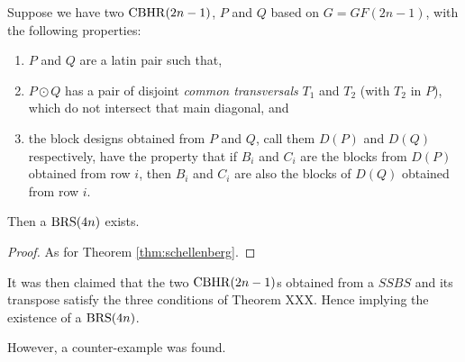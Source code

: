 \begin{theorem}
Suppose we have two $\operatorname{CBHR}(2n - 1)$, $P$ and $Q$ based on $G = GF(2n - 1)$, with the following properties:
\begin{enumerate}
  \item{$P$ and $Q$ are a latin pair such that,}
  \item{$P \odot Q$ has a pair of disjoint
    \emph{common transversals} $T_1$ and $T_2$
    (with $T_2$ in $P$), which do not intersect that main
    diagonal, and}
  \item{the block designs obtained from $P$ and $Q$, call
    them $D(P)$ and $D(Q)$ respectively, have the property
    that if $B_i$ and $C_i$ are the blocks from $D(P)$
    obtained from row $i$, then $B_i$ and $C_i$
    are also the blocks of $D(Q)$ obtained from row $i$.}
\end{enumerate}

Then a $\operatorname{BRS}(4n)$ exists.
\end{theorem}

\begin{proof}
As for Theorem \ref{thm:schellenberg}.
\end{proof}

It was then claimed that the two $\operatorname{CBHR}(2n - 1)$s obtained from a $SSBS$ and its transpose satisfy the three conditions of Theorem XXX.
Hence implying the existence of a $\operatorname{BRS}(4n)$.

However, a counter-example was found.

